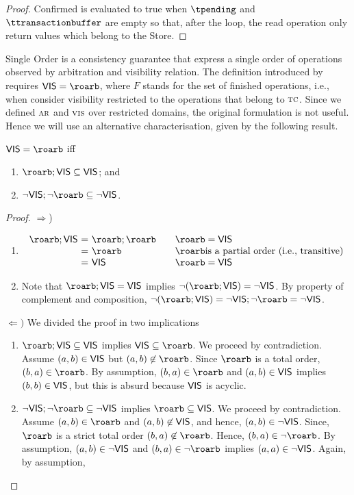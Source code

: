 \begin{proof} Confirmed is evaluated to true when $\tpending$ and $\ttransactionbuffer$ are empty so that, after the loop, the read operation only return values which belong to the Store.
\end{proof}	


Single Order is a consistency guarantee that express a single order of operations observed by arbitration and visibility relation. The definition introduced by \cite{} requires 
$\ovis = \roarb$, where $F$ stands for the set of finished operations, i.e., when consider visibility restricted to the operations that belong to $\textsc{\scriptsize{TC}}$. 
Since we defined $\textsc{\scriptsize{AR}}$ and $\textsc{\scriptsize{VIS}}$ over restricted domains, the original formulation is not useful. Hence we will use an alternative characterisation, given by the 
following result.

\begin{lemma} $\ovis = \roarb$ iff 
\begin{enumerate}
   \item $\roarb;\ovis \subseteq \ovis$; and
   \item $\neg\ovis;\neg\roarb \subseteq \neg\ovis$.
\end{enumerate}
\end{lemma}

\begin{proof} $\Rightarrow$) 
\begin{enumerate}
\item
	\[ \begin{array}{l@{\ =\ }l@{\qquad}l}
		\roarb;\ovis &  \roarb;\roarb & \roarb =\ovis\\
		& \roarb & \roarb \mbox{is a partial order (i.e., transitive)}\\
		&  \ovis & \roarb =\ovis
   	\end{array}
	\]
\item Note that  $\roarb;\ovis =\ovis$ implies $\neg(\roarb;\ovis) =\neg\ovis$. By property of complement and composition, $\neg(\roarb;\ovis) =\neg\ovis;\neg\roarb =\neg\ovis$. 
\end{enumerate}

$\Leftarrow)$ We divided the proof in two implications
 \begin{enumerate}
    \item  $\roarb;\ovis \subseteq \ovis$ implies $\ovis\subseteq \roarb$. We proceed by contradiction. Assume $(a,b)\in\mathsf{\scriptsize{VIS}}$ but $(a,b)\not\in\roarb$.
    Since $\roarb$ is a total order, $(b,a)\in\roarb$. By assumption, $(b,a)\in\roarb$ and $(a,b)\in\mathsf{\scriptsize{VIS}}$ implies $(b,b)\in\mathsf{\scriptsize{VIS}}$, but this is absurd because
    $\mathsf{\scriptsize{VIS}}$ is acyclic. 
        
    \item $\neg\ovis;\neg\roarb \subseteq \neg\ovis$ implies $\roarb\subseteq\ovis$. We proceed by contradiction. 
    Assume $(a,b)\in\roarb$ and $(a,b)\not\in\mathsf{\scriptsize{VIS}}$, and hence,  $(a,b)\in\neg\mathsf{\scriptsize{VIS}}$. Since,
    $\roarb$ is a strict total order $(b,a)\not\in\roarb$. Hence, $(b,a)\in\neg\roarb$. By assumption, $(a,b)\in\neg\mathsf{\scriptsize{VIS}}$ and $(b,a)\in\neg\roarb$ implies $(a,a)\in\neg\mathsf{\scriptsize{VIS}}$.
    Again, by assumption, 
 \end{enumerate}

\end{proof}

